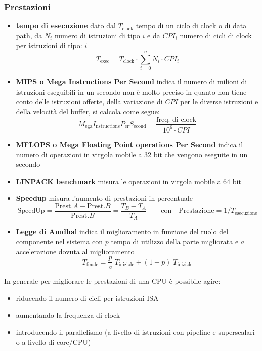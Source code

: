 \documentclass[a4paper]{article}
\begin{document}
\subsubsection*{Prestazioni}
\begin{itemize}
	\item \textbf{tempo di esecuzione} dato dal \(T_\text{clock}\) tempo di un ciclo di clock o di data path, da \(N_i\) numero
	di istruzioni di tipo \(i\) e da \(CPI_i\) numero di cicli di clock per istruzioni di tipo: \(i\) \[T_\text{exec} = T_\text{clock} \cdot \sum_{i=0}^{n} N_i \cdot CPI_i\]
	\item \textbf{MIPS o Mega Instructions Per Second} indica il numero di milioni di istruzioni eseguibili in un secondo non è
	molto preciso in quanto non tiene conto delle istruzioni offerte, della variazione di \(CPI\) per le diverse istruzioni e
	della velocità del buffer, si calcola come segue: \[M_\text{ega} I_\text{nstructions} P_\text{er} S_\text{econd} = \frac{\text{freq. di clock}}{10^6 \cdot CPI}\]
	\item \textbf{MFLOPS o Mega Floating Point operations Per Second} indica il numero di operazioni in virgola mobile a 32 bit
	che vengono eseguite in un secondo
	\item \textbf{LINPACK benchmark} misura le operazioni in virgola mobile a 64 bit
	\item \textbf{Speedup} misura l'aumento di prestazioni in percentuale \[\text{SpeedUp} = \frac{\text{Prest.} A - \text{Prest.} B}{\text{Prest.} B} = \frac{T_B - T_A}{T_A} \qquad \text{con} \quad \text{Prestazione} = 1/T_\text{esecuzione}\]
	\item \textbf{Legge di Amdhal} indica il miglioramento in funzione del ruolo del componente nel sistema con \(p\) tempo di 
	utilizzo della parte migliorata e \(a\) accelerazione dovuta al miglioramento \[T_\text{finale} = \frac{p}{a} \; T_\text{iniziale} + (1-p) \; T_\text{iniziale}\]
\end{itemize}
In generale per migliorare le prestazioni di una CPU è possibile agire:
\begin{itemize}
	\item riducendo il numero di cicli per istruzioni ISA
	\item aumentando la frequenza di clock
	\item introducendo il parallelismo (a livello di istruzioni con pipeline e superscalari o a livello di core/CPU)
\end{itemize}


\end{document}
